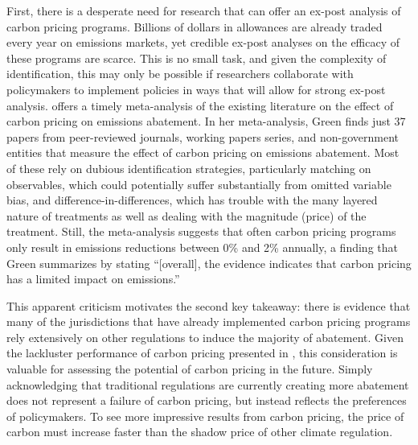 First, there is a desperate need for research that can offer an ex-post analysis of carbon pricing programs. Billions of dollars in allowances are already traded every year on emissions markets, yet credible ex-post analyses on the efficacy of these programs are scarce. This is no small task, and given the complexity of identification, this may only be possible if researchers collaborate with policymakers to implement policies in ways that will allow for strong ex-post analysis. \cite{green2021does} offers a timely meta-analysis of the existing literature on the effect of carbon pricing on emissions abatement. In her meta-analysis, Green finds just 37 papers from peer-reviewed journals, working papers series, and non-government entities that measure the effect of carbon pricing on emissions abatement. Most of these rely on dubious identification strategies, particularly matching on observables, which could potentially suffer substantially from omitted variable bias, and difference-in-differences, which has trouble with the many layered nature of treatments as well as dealing with the magnitude (price) of the treatment. Still, the meta-analysis suggests that often carbon pricing programs only result in emissions reductions between 0\% and 2\% annually, a finding that Green summarizes by stating ``[overall], the evidence indicates that carbon pricing has a limited impact on emissions.''

This apparent criticism motivates the second key takeaway: there is evidence that many of the jurisdictions that have already implemented carbon pricing programs rely extensively on other regulations to induce the majority of abatement. Given the lackluster performance of carbon pricing presented in \cite{green2021does}, this consideration is valuable for assessing the potential of carbon pricing in the future. Simply acknowledging that traditional regulations are currently creating more abatement does not represent a failure of carbon pricing, but instead reflects the preferences of policymakers. To see more impressive results from carbon pricing, the price of carbon must increase faster than the shadow price of other climate regulation.


